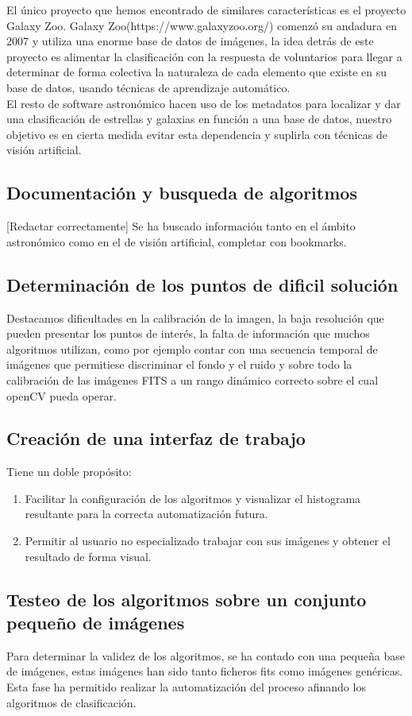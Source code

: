 	El único proyecto que hemos encontrado de similares características	es el proyecto Galaxy Zoo. Galaxy Zoo(https://www.galaxyzoo.org/) comenzó su andadura en 2007 y utiliza una enorme base de datos de imágenes, la idea detrás de este proyecto es alimentar la clasificación con la respuesta de voluntarios para llegar a determinar de forma colectiva la naturaleza de cada elemento que existe en su base de datos, usando técnicas de aprendizaje automático.\\
	El resto de software astronómico hacen uso de los metadatos para localizar y dar una clasificación de estrellas y galaxias en función a una base de datos, nuestro objetivo es en cierta medida evitar esta dependencia y suplirla con técnicas de visión artificial.\\

	\subsection{Documentación y busqueda de algoritmos}
	[Redactar correctamente] Se ha buscado información tanto en el ámbito astronómico como en el de visión artificial, completar con bookmarks.
	\subsection{Determinación de los puntos de dificil solución}
	Destacamos dificultades en la calibración de la imagen, la baja resolución que pueden presentar los puntos de interés, la falta de información que muchos algoritmos utilizan, como por ejemplo contar con una secuencia temporal de imágenes que permitiese discriminar el fondo y el ruido y sobre todo la calibración de las imágenes FITS a un rango dinámico correcto sobre el cual openCV pueda operar.

	\subsection{Creación de una interfaz de trabajo}
	Tiene un doble propósito:
	\begin{enumerate}
		\item Facilitar la configuración de los algoritmos y visualizar el histograma resultante para la correcta automatización futura.
		\item Permitir al usuario no especializado trabajar con sus imágenes y obtener el resultado de forma visual.
	\end{enumerate}
	  
	\subsection{Testeo de los algoritmos sobre un conjunto pequeño de imágenes}
	Para determinar la validez de los algoritmos, se ha contado con una pequeña base de imágenes, estas imágenes han sido tanto ficheros fits como imágenes genéricas.\\
	 Esta fase ha permitido realizar la automatización del proceso afinando los algoritmos de clasificación.
